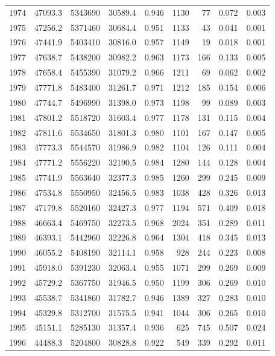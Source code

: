 \documentclass[
]{scrartcl}
\begin{document}
\begin{table}
{\begin{tabular*}{\linewidth}{@{\extracolsep{\fill}}rrrrrrrrr}
1974 & 47093.3 & 5343690 & 30589.4 & 0.946 & 1130 & 77 & 0.072 & 0.003 \\ 
1975 & 47256.2 & 5371460 & 30684.4 & 0.951 & 1133 & 43 & 0.041 & 0.001 \\ 
1976 & 47441.9 & 5403410 & 30816.0 & 0.957 & 1149 & 19 & 0.018 & 0.001 \\ 
1977 & 47638.7 & 5438200 & 30982.2 & 0.963 & 1173 & 166 & 0.133 & 0.005 \\ 
1978 & 47658.4 & 5455390 & 31079.2 & 0.966 & 1211 & 69 & 0.062 & 0.002 \\ 
1979 & 47771.8 & 5483400 & 31261.7 & 0.971 & 1212 & 185 & 0.154 & 0.006 \\ 
1980 & 47744.7 & 5496990 & 31398.0 & 0.973 & 1198 & 99 & 0.089 & 0.003 \\ 
1981 & 47801.2 & 5518720 & 31603.4 & 0.977 & 1178 & 131 & 0.115 & 0.004 \\ 
1982 & 47811.6 & 5534650 & 31801.3 & 0.980 & 1101 & 167 & 0.147 & 0.005 \\ 
1983 & 47773.3 & 5544570 & 31986.9 & 0.982 & 1104 & 126 & 0.111 & 0.004 \\ 
1984 & 47771.2 & 5556220 & 32190.5 & 0.984 & 1280 & 144 & 0.128 & 0.004 \\ 
1985 & 47741.9 & 5563640 & 32377.3 & 0.985 & 1260 & 299 & 0.245 & 0.009 \\ 
1986 & 47534.8 & 5550950 & 32456.5 & 0.983 & 1038 & 428 & 0.326 & 0.013 \\ 
1987 & 47179.8 & 5520160 & 32427.3 & 0.977 & 1194 & 571 & 0.409 & 0.018 \\ 
1988 & 46663.4 & 5469750 & 32273.5 & 0.968 & 2024 & 351 & 0.289 & 0.011 \\ 
1989 & 46393.1 & 5442960 & 32226.8 & 0.964 & 1304 & 418 & 0.345 & 0.013 \\ 
1990 & 46055.2 & 5408190 & 32114.1 & 0.958 & 928 & 244 & 0.223 & 0.008 \\ 
1991 & 45918.0 & 5391230 & 32063.4 & 0.955 & 1071 & 299 & 0.269 & 0.009 \\ 
1992 & 45729.2 & 5367750 & 31946.5 & 0.950 & 1199 & 306 & 0.269 & 0.010 \\ 
1993 & 45538.7 & 5341860 & 31782.7 & 0.946 & 1389 & 327 & 0.283 & 0.010 \\ 
1994 & 45329.8 & 5312700 & 31575.5 & 0.941 & 1044 & 306 & 0.265 & 0.010 \\ 
1995 & 45151.1 & 5285130 & 31357.4 & 0.936 & 625 & 745 & 0.507 & 0.024 \\ 
1996 & 44488.3 & 5204800 & 30828.8 & 0.922 & 549 & 339 & 0.292 & 0.011 \\ 

\end{tabular*}}
\end{table}
\end{document}
